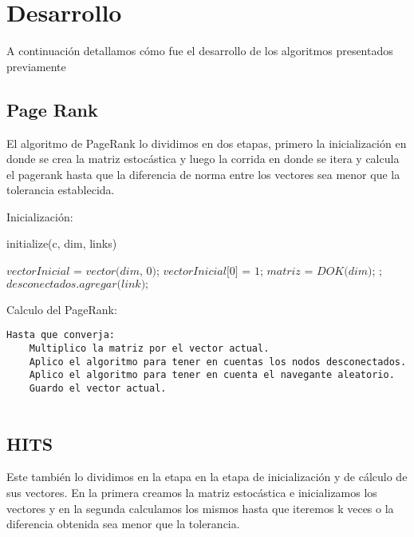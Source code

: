 \section{Desarrollo}

A continuación detallamos cómo fue el desarrollo de los algoritmos presentados previamente

\subsection{Page Rank}
El algoritmo de PageRank lo dividimos en dos etapas, primero la inicializaci\'on en donde se crea la matriz estoc\'astica y luego la corrida en donde se itera y calcula el pagerank hasta que la diferencia de norma entre los vectores sea menor que la tolerancia establecida.

Inicializaci\'on:


\begin{algorithm}
\caption{initialize(c, dim, links)}\label{euclid}
\begin{algorithmic}[1]
\State $\textit{vectorInicial = vector(dim, 0);}$ 
\State $\textit{vectorInicial[0] = 1;}$ 
\State $\textit{matriz = DOK(dim);}$ 
\State $\textit{;}$ \Comment{}
\EndFor
\Else
\State $\textit{desconectados.agregar(link);}$ \Comment{}
\EndIf
\EndFor


\end{algorithmic}
\end{algorithm}

Calculo del PageRank:
\begin{lstlisting}[frame=single] 
Hasta que converja:
	Multiplico la matriz por el vector actual.
	Aplico el algoritmo para tener en cuentas los nodos desconectados.
	Aplico el algoritmo para tener en cuenta el navegante aleatorio.
	Guardo el vector actual.
	
\end{lstlisting}


\subsection{HITS}
Este también lo dividimos en la etapa en la etapa de inicialización y de cálculo de sus vectores. En la primera creamos la matriz estocástica e inicializamos los vectores y en la segunda calculamos los mismos hasta que iteremos k veces o la diferencia obtenida sea menor que la tolerancia.

